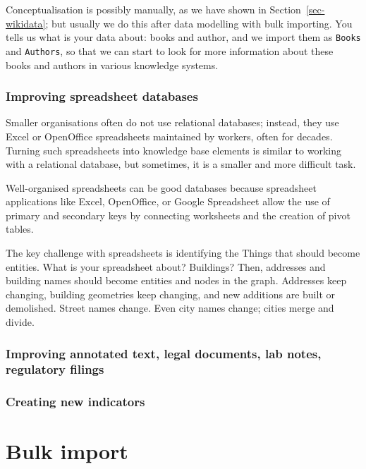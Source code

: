\documentclass[
  letterpaper,
  DIV=11,
  numbers=noendperiod]{scrreprt}
\begin{document}
Conceptualisation is possibly manually, as we have shown in
Section~\ref{sec-wikidata}; but usually we do this after data modelling
with bulk importing. You tells us what is your data about: books and
author, and we import them as \texttt{Books} and \texttt{Authors}, so
that we can start to look for more information about these books and
authors in various knowledge systems.

\subsection{Improving spreadsheet
databases}\label{improving-spreadsheet-databases}

Smaller organisations often do not use relational databases; instead,
they use Excel or OpenOffice spreadsheets maintained by workers, often
for decades. Turning such spreadsheets into knowledge base elements is
similar to working with a relational database, but sometimes, it is a
smaller and more difficult task.

Well-organised spreadsheets can be good databases because spreadsheet
applications like Excel, OpenOffice, or Google Spreadsheet allow the use
of primary and secondary keys by connecting worksheets and the creation
of pivot tables.

The key challenge with spreadsheets is identifying the Things that
should become entities. What is your spreadsheet about? Buildings? Then,
addresses and building names should become entities and nodes in the
graph. Addresses keep changing, building geometries keep changing, and
new additions are built or demolished. Street names change. Even city
names change; cities merge and divide.

\subsection{Improving annotated text, legal documents, lab notes,
regulatory
filings}\label{improving-annotated-text-legal-documents-lab-notes-regulatory-filings}

\subsection{Creating new indicators}\label{creating-new-indicators}


\chapter{Bulk import}\label{bulk-import}
\end{document}

